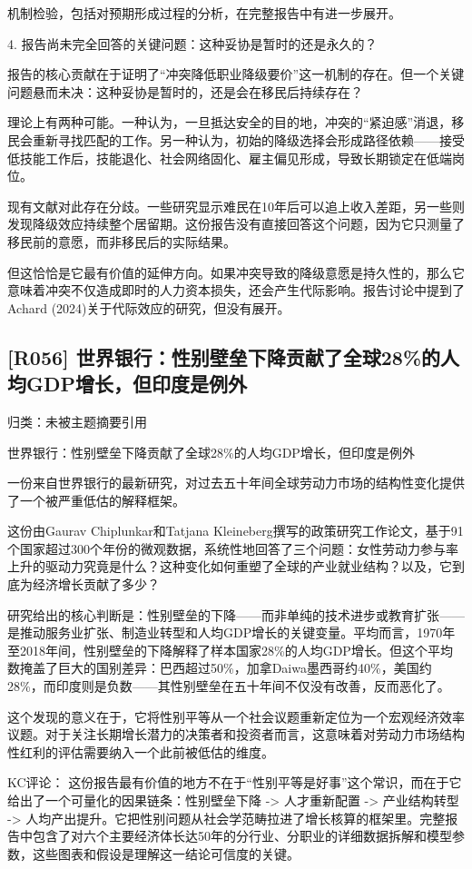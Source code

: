 \documentclass[11pt]{ctexart}
\begin{document}
机制检验，包括对预期形成过程的分析，在完整报告中有进一步展开。

4. 报告尚未完全回答的关键问题：这种妥协是暂时的还是永久的？

报告的核心贡献在于证明了“冲突降低职业降级要价”这一机制的存在。但一个关键问题悬而未决：这种妥协是暂时的，还是会在移民后持续存在？

理论上有两种可能。一种认为，一旦抵达安全的目的地，冲突的“紧迫感”消退，移民会重新寻找匹配的工作。另一种认为，初始的降级选择会形成路径依赖——接受低技能工作后，技能退化、社会网络固化、雇主偏见形成，导致长期锁定在低端岗位。

现有文献对此存在分歧。一些研究显示难民在10年后可以追上收入差距，另一些则发现降级效应持续整个居留期。这份报告没有直接回答这个问题，因为它只测量了移民前的意愿，而非移民后的实际结果。

但这恰恰是它最有价值的延伸方向。如果冲突导致的降级意愿是持久性的，那么它意味着冲突不仅造成即时的人力资本损失，还会产生代际影响。报告讨论中提到了Achard (2024)关于代际效应的研究，但没有展开。

\subsection{[R056] 世界银行：性别壁垒下降贡献了全球28\%的人均GDP增长，但印度是例外}
{\small\color{refgray}归类：未被主题摘要引用}

世界银行：性别壁垒下降贡献了全球28\%的人均GDP增长，但印度是例外

一份来自世界银行的最新研究，对过去五十年间全球劳动力市场的结构性变化提供了一个被严重低估的解释框架。

这份由Gaurav Chiplunkar和Tatjana Kleineberg撰写的政策研究工作论文，基于91个国家超过300个年份的微观数据，系统性地回答了三个问题：女性劳动力参与率上升的驱动力究竟是什么？这种变化如何重塑了全球的产业就业结构？以及，它到底为经济增长贡献了多少？

研究给出的核心判断是：性别壁垒的下降——而非单纯的技术进步或教育扩张——是推动服务业扩张、制造业转型和人均GDP增长的关键变量。平均而言，1970年至2018年间，性别壁垒的下降解释了样本国家28\%的人均GDP增长。但这个平均数掩盖了巨大的国别差异：巴西超过50\%，加拿Daiwa墨西哥约40\%，美国约28\%，而印度则是负数——其性别壁垒在五十年间不仅没有改善，反而恶化了。

这个发现的意义在于，它将性别平等从一个社会议题重新定位为一个宏观经济效率议题。对于关注长期增长潜力的决策者和投资者而言，这意味着对劳动力市场结构性红利的评估需要纳入一个此前被低估的维度。

KC评论： 这份报告最有价值的地方不在于“性别平等是好事”这个常识，而在于它给出了一个可量化的因果链条：性别壁垒下降 -> 人才重新配置 -> 产业结构转型 -> 人均产出提升。它把性别问题从社会学范畴拉进了增长核算的框架里。完整报告中包含了对六个主要经济体长达50年的分行业、分职业的详细数据拆解和模型参数，这些图表和假设是理解这一结论可信度的关键。
\end{document}
